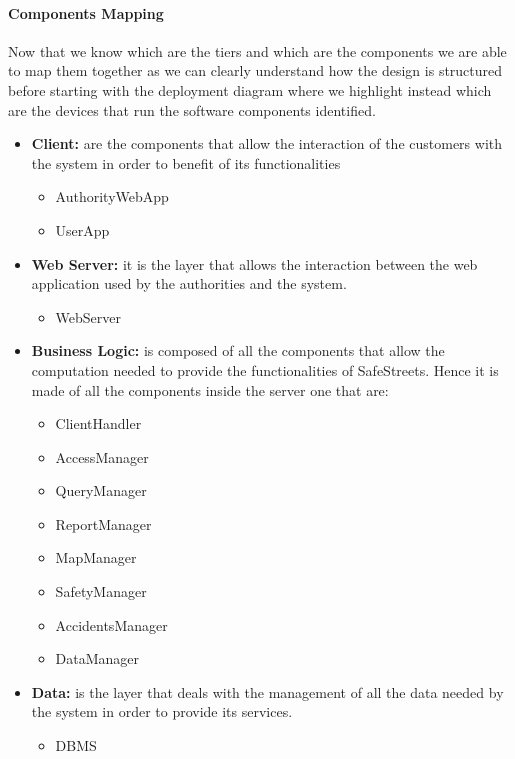 		\paragraph{Components Mapping} Now that we know which are the tiers and which are the components we are able to map them together as we can clearly understand how the design is structured before starting with the deployment diagram where we highlight instead which are the devices that run the software components identified.
		
		\begin{itemize}
			\item \textbf{Client:} are the components that allow the interaction of the customers with the system in order to benefit of its functionalities
			
				\begin{itemize}
					\item AuthorityWebApp
					\item UserApp
				\end{itemize}
			
			\item \textbf{Web Server:} it is the layer that allows the interaction between the web application used by the authorities and the system.
			
				\begin{itemize}
					\item WebServer
				\end{itemize}
			
			\item \textbf{Business Logic:} is composed of all the components that allow the computation needed to provide the functionalities of SafeStreets. Hence it is made of all the components inside the server one that are:
			
				\begin{itemize}
					\item ClientHandler
					\item AccessManager
					\item QueryManager
					\item ReportManager
					\item MapManager
					\item SafetyManager
					\item AccidentsManager
					\item DataManager
				\end{itemize}
			
			\item \textbf{Data:} is the layer that deals with the management of all the data needed by the system in order to provide its services.
			
				\begin{itemize}
					\item DBMS
				\end{itemize}
		\end{itemize}
	
